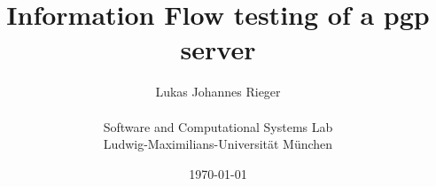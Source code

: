 \documentclass[11pt,a4paper,oneside,openright]{report}
\begin{document}
\title{Information Flow testing of a pgp server}
\author{Lukas Johannes Rieger \\ \\
    Software and Computational Systems Lab \\
    Ludwig-Maximilians-Universität München \\

}
\date{\today}
\maketitle

\begin{abstract}

\end{abstract}
\tableofcontents





\end{document}
